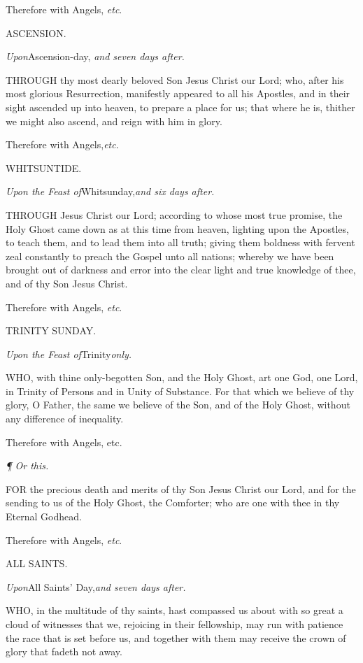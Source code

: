Therefore with Angels, \emph{etc}.

ASCENSION.

\emph{Upon}Ascension-day, \emph{and seven days after.}

THROUGH
thy most dearly beloved Son Jesus Christ our Lord; who, after his most
glorious Resurrection, manifestly appeared to all his Apostles, and in
their sight ascended up into heaven, to prepare a place for us; that where
he is, thither we might also ascend, and reign with him in glory. 

Therefore with Angels,\emph{etc}.

WHITSUNTIDE.

\emph{Upon
the Feast of}Whitsunday,\emph{and six days after.}

THROUGH
Jesus Christ our Lord; according to whose most true promise, the Holy
Ghost came down as at this time from heaven, lighting upon the Apostles,
to teach them, and to lead them into all truth; giving them boldness with
fervent zeal constantly to preach the Gospel unto all nations; whereby
we have been brought out of darkness and error into the clear light and
true knowledge of thee, and of thy Son Jesus Christ. 

Therefore with Angels, \emph{etc}.

TRINITY SUNDAY.

\emph{Upon
the Feast of}Trinity\emph{only.}

WHO,
with thine only-begotten Son, and the Holy Ghost, art one God, one Lord,
in Trinity of Persons and in Unity of Substance. For that which we believe
of thy glory, O Father, the same we believe of the Son, and of the Holy
Ghost, without any difference of inequality.

Therefore with Angels, etc.

\emph{¶
Or this.}

FOR
the precious death and merits of thy Son Jesus Christ our Lord, and for
the sending to us of the Holy Ghost, the Comforter; who are one with thee
in thy Eternal Godhead. 

Therefore with Angels, \emph{etc}.

ALL SAINTS.

\emph{Upon}All Saints’ Day,\emph{and seven days after.}

WHO,
in the multitude of thy saints, hast compassed us about with so great
a cloud of witnesses that we, rejoicing in their fellowship, may run with
patience the race that is set before us, and together with them may receive
the crown of glory that fadeth not away.

